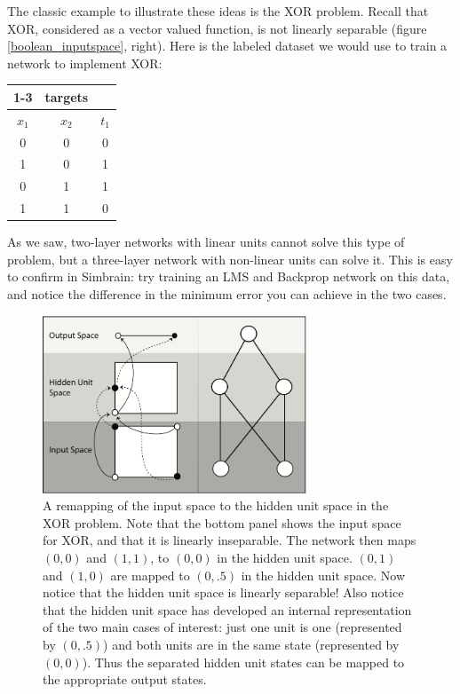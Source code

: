 The classic example to illustrate these ideas is the XOR problem. Recall that XOR, considered as a vector valued function, is not linearly separable (figure \ref{boolean_inputspace}, right). Here is the labeled dataset we would use to train a network to implement XOR:
\begin{center}
\begin{tabular}{| c | c || c | }
\cline{1-3}
\multicolumn{2}{| c || }{inputs}
 & \multicolumn{1}{c|}{targets} \\
\hline
  $x_1$  & $x_2$ & $t_1$  \\
\hline
  0 & 0 & 0  \\
\hline
 1 & 0 & 1  \\
\hline
 0 & 1 & 1 \\
\hline
1 & 1 & 0 \\
\hline
\end{tabular}
\end{center}
As we saw, two-layer networks with linear units cannot solve this type of problem, but a three-layer network with non-linear units can solve it. This is easy to confirm in Simbrain: try training an LMS and Backprop network on this data, and notice the difference in the minimum error you can achieve in the two cases. %
	
\begin{figure}[h]
\centering
\includegraphics[width=0.7\textwidth]{images/xor_internal_rep.png}
\caption[Pamela Payne.]{A remapping of the input space to the hidden unit space in the XOR problem. Note that the bottom panel shows the input space for XOR, and that it is linearly inseparable. The network then maps $(0,0)$ and $(1,1)$,  to $(0,0)$ in the hidden unit space. $(0,1)$ and $(1,0)$ are mapped to $(0,.5)$ in the hidden unit space. Now notice that the hidden unit space is linearly separable!  Also notice that the hidden unit space has developed an internal representation of the two main cases of interest: just one unit is one (represented by $(0,.5)$) and both units are in the same state (represented by $(0,0)$). Thus the separated hidden unit states can be mapped to the appropriate output states.}
\label{xor_remapping}
\end{figure}



